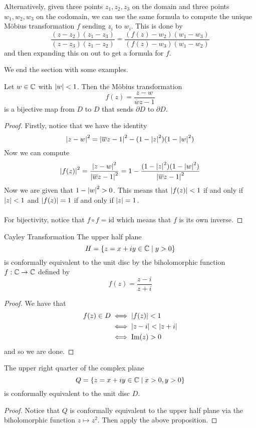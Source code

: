 \documentclass[a4paper]{article}
\begin{document}
Alternatively, given three points $z_1,z_2,z_3$ on the domain and three points $w_1,w_2,w_3$ on the codomain, we can use the same formula to compute the unique Möbius transformation $f$ sending $z_i$ to $w_i$. This is done by $$\frac{(z-z_2)(z_1-z_3)}{(z-z_3)(z_1-z_2)}=\frac{(f(z)-w_2)(w_1-w_3)}{(f(z)-w_3)(w_1-w_2)}$$ and then expanding this on out to get a formula for $f$. 

We end the section with some examples. 

\begin{thm}{}{} Let $w\in\mathbb{C}$ with $\abs{w}<1$. Then the Möbius transformation $$f(z)=\frac{z-w}{\overline{w}z-1}$$ is a bijective map from $D$ to $D$ that sends $\partial D$ to $\partial D$. \tcbline
\begin{proof}
Firstly, notice that we have the identity $$\abs{z-w}^2=\abs{\overline{w}z-1}^2-(1-\abs{z}^2)(1-\abs{w}^2)$$ Now we can compute $$\abs{f(z)}^2=\frac{\abs{z-w}^2}{\abs{\overline{w}z-1}^2}=1-\frac{(1-\abs{z}^2)(1-\abs{w}^2)}{\abs{\overline{w}z-1}^2}$$ Now we are given that $1-\abs{w}^2>0$. This means that $\abs{f(z)}<1$ if and only if $\abs{z}<1$ and $\abs{f(z)}=1$ if and only if $\abs{z}=1$. \\~\\

For bijectivity, notice that $f\circ f=\text{id}$ which means that $f$ is its own inverse. 
\end{proof}
\end{thm}

\begin{prp}{Cayley Transformation}{} The upper half plane $$H=\{z=x+iy\in\mathbb{C}\;|\;y>0\}$$ is conformally equivalent to the unit disc by the biholomorphic function $f:\mathbb{C}\to\mathbb{C}$ defined by $$f(z)=\frac{z-i}{z+i}$$ \tcbline
\begin{proof}
We have that 
\begin{align*}
f(z)\in D&\iff \abs{f(z)}<1\\
&\iff \abs{z-i}<\abs{z+i}\\
&\iff\text{Im}(z)>0
\end{align*}
and so we are done. 
\end{proof}
\end{prp}

\begin{prp}{}{} The upper right quarter of the complex plane $$Q=\{z=x+iy\in\mathbb{C}\;|\;x>0,y>0\}$$ is conformally equivalent to the unit disc $D$. \tcbline
\begin{proof}
Notice that $Q$ is conformally equivalent to the upper half plane via the biholomorphic function $z\mapsto z^2$. Then apply the above proposition. 
\end{proof}
\end{prp}
\end{document}
